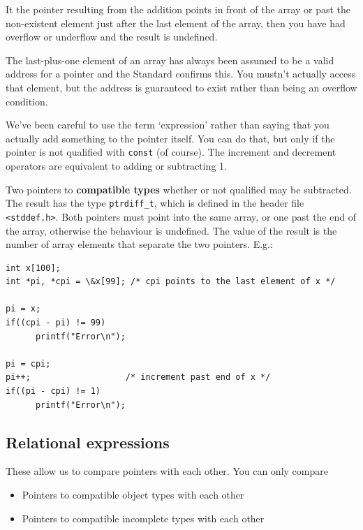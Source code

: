    It the pointer resulting from the addition points in front of the
    array or past the non-existent element just after the last element of
    the array, then you have had overflow or underflow and the result is
    undefined.


   The last-plus-one element of an array has always been assumed to be
    a valid address for a pointer and the Standard confirms this. You
    mustn't actually access that element, but the address is guaranteed to
    exist rather than being an overflow condition.


   We've been careful to use the term `expression' rather than
    saying that you actually add something to the pointer itself. You can do
    that, but only if the pointer is not qualified with \texttt{const}
    (of course). The increment and decrement operators are equivalent to
    adding or subtracting 1.


   Two pointers to \textbf{compatible types} whether or not qualified
    may be subtracted. The result has the type \texttt{ptrdiff\_t}, which
    is defined in the header file \texttt{<stddef.h>}. Both
    pointers must point into the same array, or one past the end of the
    array, otherwise the behaviour is undefined. The value of the result is
    the number of array elements that separate the two pointers. E.g.:


   \begin{Verbatim}
int x[100];
int *pi, *cpi = \&x[99]; /* cpi points to the last element of x */

pi = x;
if((cpi - pi) != 99)
      printf("Error\n");

pi = cpi;
pi++;                   /* increment past end of x */
if((pi - cpi) != 1)
      printf("Error\n");
\end{Verbatim}

  

  \subsection{Relational expressions}
   

   These allow us to compare pointers with each other. You can only
    compare


   \begin{itemize}
    \item Pointers to compatible object types with each other
    \item Pointers to compatible incomplete types with each other
   \end{itemize}

